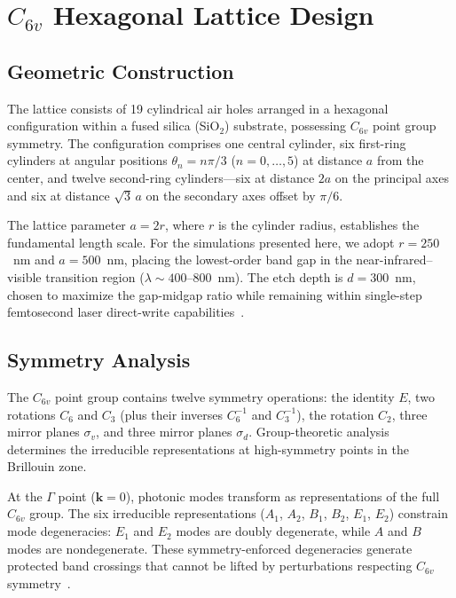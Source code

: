 \documentclass[10pt,letterpaper]{article}
\begin{document}
\section{$C_{6v}$ Hexagonal Lattice Design}
\label{sec:lattice}

\subsection{Geometric Construction}

The lattice consists of 19 cylindrical air holes arranged in a hexagonal configuration within a fused silica (SiO$_2$) substrate, possessing $C_{6v}$ point group symmetry. The configuration comprises one central cylinder, six first-ring cylinders at angular positions $\theta_n = n\pi/3$ ($n = 0,\ldots,5$) at distance $a$ from the center, and twelve second-ring cylinders---six at distance $2a$ on the principal axes and six at distance $\sqrt{3}\,a$ on the secondary axes offset by $\pi/6$.

The lattice parameter $a = 2r$, where $r$ is the cylinder radius, establishes the fundamental length scale. For the simulations presented here, we adopt $r = 250$~nm and $a = 500$~nm, placing the lowest-order band gap in the near-infrared--visible transition region ($\lambda \sim 400$--$800$~nm). The etch depth is $d = 300$~nm, chosen to maximize the gap-midgap ratio while remaining within single-step femtosecond laser direct-write capabilities~\cite{Davis1996,SzameitNolte2010}.

\subsection{Symmetry Analysis}

The $C_{6v}$ point group contains twelve symmetry operations: the identity $E$, two rotations $C_6$ and $C_3$ (plus their inverses $C_6^{-1}$ and $C_3^{-1}$), the rotation $C_2$, three mirror planes $\sigma_v$, and three mirror planes $\sigma_d$. Group-theoretic analysis~\cite{Joannopoulos2008,Sakoda2001} determines the irreducible representations at high-symmetry points in the Brillouin zone.

At the $\Gamma$ point ($\mathbf{k} = 0$), photonic modes transform as representations of the full $C_{6v}$ group. The six irreducible representations ($A_1$, $A_2$, $B_1$, $B_2$, $E_1$, $E_2$) constrain mode degeneracies: $E_1$ and $E_2$ modes are doubly degenerate, while $A$ and $B$ modes are nondegenerate. These symmetry-enforced degeneracies generate protected band crossings that cannot be lifted by perturbations respecting $C_{6v}$ symmetry~\cite{Haldane2008}.
\end{document}
